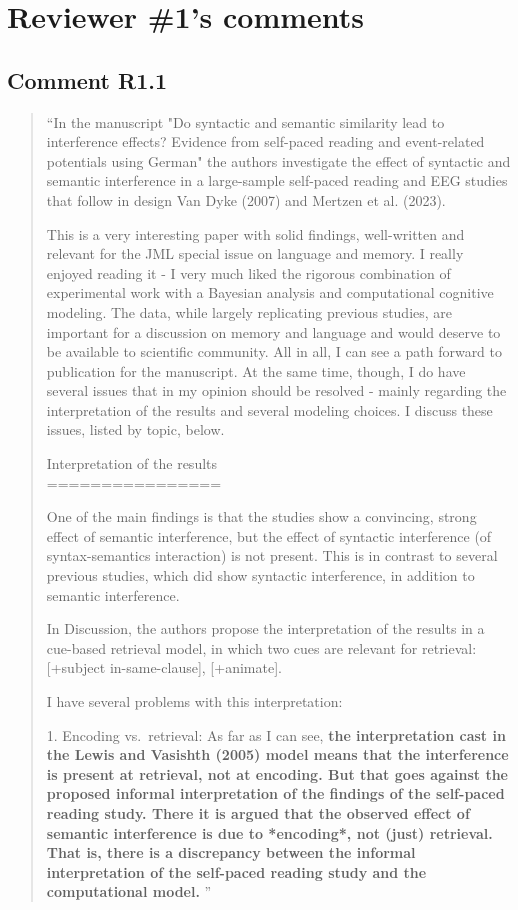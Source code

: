 \documentclass[12pt]{article}
\begin{document}
\begin{quote}
\end{quote}

\section*{Reviewer \#1's comments} 
\subsection*{Comment R1.1}
\begin{quote}
``In the manuscript "Do syntactic and semantic similarity lead to interference effects? Evidence from self-paced reading and event-related potentials using German" the authors investigate the effect of syntactic and semantic interference in a large-sample self-paced reading and EEG studies that follow in design Van Dyke (2007) and Mertzen et al. (2023).

This is a very interesting paper with solid findings, well-written and relevant for the JML special issue on language and memory. I really enjoyed reading it - I very much liked the rigorous combination of experimental work with a Bayesian analysis and computational cognitive modeling. The data, while largely replicating previous studies, are important for a discussion on memory and language and would deserve to be available to scientific community. All in all, I can see a path forward to publication for the manuscript. At the same time, though, I do have several issues that in my opinion should be resolved - mainly regarding the interpretation of the results and several modeling choices. I discuss these issues, listed by topic, below.

Interpretation of the results\\
================

One of the main findings is that the studies show a convincing, strong effect of semantic interference, but the effect of syntactic interference (of syntax-semantics interaction) is not present. This is in contrast to several previous studies, which did show syntactic interference, in addition to semantic interference.

In Discussion, the authors propose the interpretation of the results in a cue-based retrieval model, in which two cues are relevant for retrieval: [+subject in-same-clause], [+animate].

I have several problems with this interpretation:

1. Encoding vs.\ retrieval: As far as I can see, \textbf{the interpretation cast in the Lewis and Vasishth (2005) model means that the interference is present at retrieval, not at encoding. But that goes against the proposed informal interpretation of the findings of the self-paced reading study. There it is argued that the observed effect of semantic interference is due to *encoding*, not (just) retrieval. That is, there is a discrepancy between the informal interpretation of the self-paced reading study and the computational model.} ''\end{quote}
\end{document}
